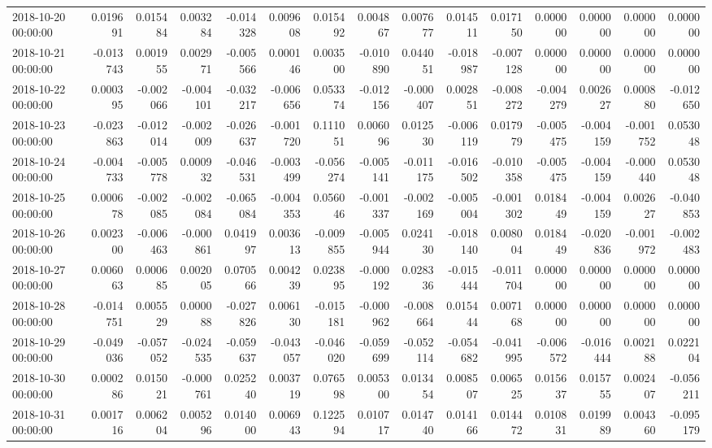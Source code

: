 \begin{tabular}{lrrrrrrrrrrrrrr}
2018-10-20 00:00:00 & 0.019691 & 0.015484 & 0.003284 & -0.014328 & 0.009608 & 0.015492 & 0.004867 & 0.007677 & 0.014511 & 0.017150 & 0.000000 & 0.000000 & 0.000000 & 0.000000 \\
2018-10-21 00:00:00 & -0.013743 & 0.001955 & 0.002971 & -0.005566 & 0.000146 & 0.003500 & -0.010890 & 0.044051 & -0.018987 & -0.007128 & 0.000000 & 0.000000 & 0.000000 & 0.000000 \\
2018-10-22 00:00:00 & 0.000395 & -0.002066 & -0.004101 & -0.032217 & -0.006656 & 0.053374 & -0.012156 & -0.000407 & 0.002851 & -0.008272 & -0.004279 & 0.002627 & 0.000880 & -0.012650 \\
2018-10-23 00:00:00 & -0.023863 & -0.012014 & -0.002009 & -0.026637 & -0.001720 & 0.111051 & 0.006096 & 0.012530 & -0.006119 & 0.017979 & -0.005475 & -0.004159 & -0.001752 & 0.053048 \\
2018-10-24 00:00:00 & -0.004733 & -0.005778 & 0.000932 & -0.046531 & -0.003499 & -0.056274 & -0.005141 & -0.011175 & -0.016502 & -0.010358 & -0.005475 & -0.004159 & -0.000440 & 0.053048 \\
2018-10-25 00:00:00 & 0.000678 & -0.002085 & -0.002084 & -0.065084 & -0.004353 & 0.056046 & -0.001337 & -0.002169 & -0.005004 & -0.001302 & 0.018449 & -0.004159 & 0.002627 & -0.040853 \\
2018-10-26 00:00:00 & 0.002300 & -0.006463 & -0.000861 & 0.041997 & 0.003613 & -0.009855 & -0.005944 & 0.024130 & -0.018140 & 0.008004 & 0.018449 & -0.020836 & -0.001972 & -0.002483 \\
2018-10-27 00:00:00 & 0.006063 & 0.000685 & 0.002005 & 0.070566 & 0.004239 & 0.023895 & -0.000192 & 0.028336 & -0.015444 & -0.011704 & 0.000000 & 0.000000 & 0.000000 & 0.000000 \\
2018-10-28 00:00:00 & -0.014751 & 0.005529 & 0.000088 & -0.027826 & 0.006130 & -0.015181 & -0.000962 & -0.008664 & 0.015444 & 0.007168 & 0.000000 & 0.000000 & 0.000000 & 0.000000 \\
2018-10-29 00:00:00 & -0.049036 & -0.057052 & -0.024535 & -0.059637 & -0.043057 & -0.046020 & -0.059699 & -0.052114 & -0.054682 & -0.041995 & -0.006572 & -0.016444 & 0.002188 & 0.022104 \\
2018-10-30 00:00:00 & 0.000286 & 0.015021 & -0.000761 & 0.025240 & 0.003719 & 0.076598 & 0.005300 & 0.013454 & 0.008507 & 0.006525 & 0.015637 & 0.015755 & 0.002407 & -0.056211 \\
2018-10-31 00:00:00 & 0.001716 & 0.006204 & 0.005296 & 0.014000 & 0.006943 & 0.122594 & 0.010717 & 0.014740 & 0.014166 & 0.014472 & 0.010831 & 0.019989 & 0.004360 & -0.095179 \\

\end{tabular}
